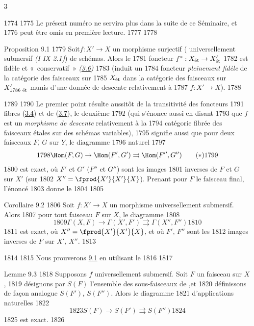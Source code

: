 3	\documentclass[10pt]{../fichiers-configuration-latex/smfart}
\begin{document}
  1774	
  1775	Le présent numéro ne servira plus dans la suite de ce Séminaire, et
  1776	peut être omis en première lecture.
  1777	
  1778	\begin{enonce*}{Proposition 9.1}
  1779	Soit\pageoriginale  $f:X'\rightarrow X$ un morphisme surjectif (	universellement submersif \emph{(\SGA I IX 2.1)}) de schémas. Alors le
  1781	foncteur $f^{\ast}:X_{\text{\rm ét}}\rightarrow X'_{\text{\rm ét}}$
  1782	est fidèle et « conservatif » \emph{(\cf \hyperref[VIII.cor3.6]{3.6})}
  1783	(\resp induit un
  1784	foncteur \emph{pleinement fidèle} de la catégorie des faisceaux sur
  1785	$X_{\text{\rm ét}}$ dans la catégorie des faisceaux sur $X'_{\text{\rm
  1786	    ét}}$ munis d'une donnée de descente relativement à
  1787	$f:X'\rightarrow X$).
  1788	\end{enonce*}
  1789	
  1790	Le premier point résulte aussitôt de la transitivité des foncteurs
  1791	fibres (\hyperref[VIII.subsec3.4]{3.4}) et de (\hyperref[VIII.cor3.7]{3.7}), le deuxième
  1792	(qui s'énonce aussi en disant
  1793	que $f$ est un \emph{morphisme de descente} relativement à la
  1794	catégorie fibrée des faisceaux étales sur des schémas variables),
  1795	signifie aussi que pour deux faisceaux $F$, $G$ sur $Y$, le diagramme
  1796	naturel
  1797	\begin{equation*}
  1798	\Hom(F,G)\rightarrow \Hom (F',G')\rightrightarrows \Hom (F'',G'')\tag{$\ast$}
  1799	\end{equation*}
  1800	est exact, où $F'$ et $G'$ (\resp $F''$ et $G''$) sont les images
  1801	inverses de $F$ et $G$ sur $X'$ (\resp sur
  1802	$X''=\fprod{X'}{X'}{X}$). Prenant pour $F$ le faisceau final, l'énoncé
  1803	donne le
  1804	
  1805	\begin{enonce*}{Corollaire 9.2}
  1806	Soit $f:X'\rightarrow X$ un morphisme universellement submersif. Alors
  1807	pour tout faisceau $F$ sur $X$, le diagramme
  1808	$$
  1809	\Gamma(X,F)\rightarrow \Gamma(X',F')\rightrightarrows \Gamma(X'',F'')
  1810	$$
  1811	est exact, où $X''=\fprod{X'}{X'}{X}$, et où $F'$, $F''$ sont les
  1812	images inverses de $F$ sur $X'$, $X''$.
  1813	\end{enonce*}
  1814	
  1815	Nous prouverons \hyperref[VIII.prop9.1]{9.1} en utilisant le
  1816	
  1817	\begin{enonce*}{Lemme 9.3}
  1818	Supposons $f$ universellement submersif. Soit $F$ un faisceau sur $X$,
  1819	désignons par $S(F)$ l'ensemble des sous-faisceaux de ,\pageoriginale  et
  1820	définissons de façon analogue $S(F')$, $S(F'')$. Alors le diagramme
  1821	d'applications naturelles
  1822	$$
  1823	S(F)\rightarrow S(F')\rightrightarrows S(F'')
  1824	$$
  1825	est exact.
  1826	\end{enonce*}
\end{document}
